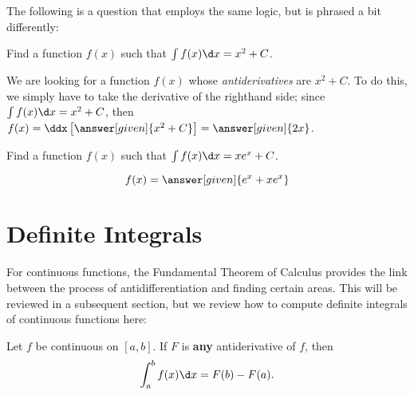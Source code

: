 \documentclass[nooutcomes]{ximera}
\begin{document}
The following is a question that employs the same logic, but is phrased a bit differently:

\begin{example}
  Find a function $f(x)$ such that $\int f(x) \d x = x^2 +C$.
  
  \begin{explanation}
    We are looking for a function $f(x)$ whose \emph{antiderivatives} are $x^2+C$.  To do this, we simply have to take the derivative of the righthand side; since $\int f(x) \d x =x^2+C$, then $f(x) = \ddx \left[\answer[given]{x^2+C}\right] =\answer[given]{2x}$.
    
    \end{explanation}
\end{example}

\begin{question} 
  Find a function $f(x)$ such that $\int f(x) \d x = xe^x +C$.

  \begin{prompt} 
    \[
    f(x) = \answer[given]{e^x + xe^x}
    \]
  \end{prompt}
  
\end{question}





\section{Definite Integrals}
For continuous functions, the Fundamental Theorem of Calculus provides the link between the process of antidifferentiation and finding certain areas.  This will be reviewed in a subsequent section, but we review how to compute definite integrals of continuous functions here:

\begin{theorem}
  Let $f$ be continuous on $[a,b]$. If $F$ is \textbf{any}
  antiderivative of $f$, then
  \[
  \int_a^b f(x)\d x = F(b)-F(a).
  \]
\end{theorem}
\end{document}
